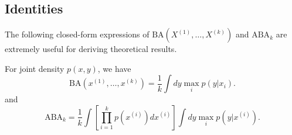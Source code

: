 \documentclass[12pt]{article}
\begin{document}
\subsection{Identities}
The following closed-form expressions of $\text{BA}(X^{(1)},\hdots,
X^{(k)})$ and $\text{ABA}_k$ are extremely useful for deriving
theoretical results.
\begin{theorem}
For joint density $p(x, y)$, we have
\[
\text{BA}(x^{(1)},\hdots, x^{(k)}) = \frac{1}{k} \int dy \max_i p(y|x_i).
\]
and
\[
\text{ABA}_k = \frac{1}{k} \int \left[\prod_{i=1}^k p(x^{(i)}) dx^{(i)} \right] \int dy \max_i p(y|x^{(i)}).
\]
\end{theorem}
\end{document}

